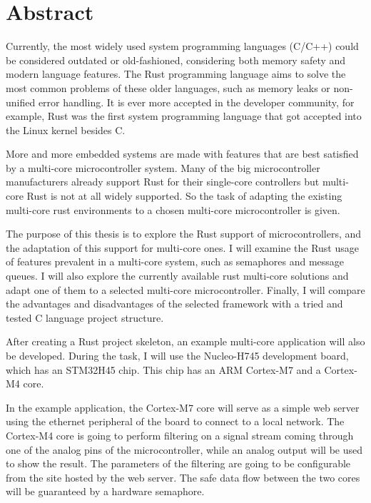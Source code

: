 \vfill
\selectenglish


\chapter*{Abstract}

Currently, the most widely used system programming languages (C/C++) could be considered outdated or old-fashioned, considering both memory safety and modern language features. The Rust programming language aims to solve the most common problems of these older languages, such as memory leaks or non-unified error handling. It is ever more accepted in the developer community, for example, Rust was the first system programming language that got accepted into the Linux kernel besides C. \cite{FirstRustCommit}

More and more embedded systems are made with features that are best satisfied by a multi-core microcontroller system. Many of the big microcontroller manufacturers already support Rust for their single-core controllers but multi-core Rust is not at all widely supported. So the task of adapting the existing multi-core rust environments to a chosen multi-core microcontroller is given.

The purpose of this thesis is to explore the Rust support of microcontrollers, and the adaptation of this support for multi-core ones. I will examine the Rust usage of features prevalent in a multi-core system, such as semaphores and message queues. I will also explore the currently available rust multi-core solutions and adapt one of them to a selected multi-core microcontroller. Finally, I will compare the advantages and disadvantages of the selected framework with a tried and tested C language project structure.

After creating a Rust project skeleton, an example multi-core application will also be developed. During the task, I will use the Nucleo-H745 development board, which has an STM32H45 chip. This chip has an ARM Cortex-M7 and a Cortex-M4 core.

In the example application, the Cortex-M7 core will serve as a simple web server using the ethernet peripheral of the board to connect to a local network. The Cortex-M4 core is going to perform filtering on a signal stream coming through one of the analog pins of the microcontroller, while an analog output will be used to show the result. The parameters of the filtering are going to be configurable from the site hosted by the web server. The safe data flow between the two cores will be guaranteed by a hardware semaphore.


\vfill
\selectthesislanguage

\setcounter{romanPage}{\value{page}}
